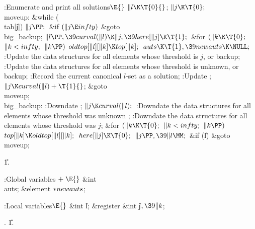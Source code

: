 \Y\B\4:Enumerate and print all solutions\X${}\E{}$\6
$\|l\K\T{0}{}$;\5
${}\|j\K\T{0};{}$\6
\4\\{moveup}:\5
\&{while} (\\{tab}[\|j])\1\5
${}\|j\PP;{}$\2\6
\&{if} ${}(\|j\E\\{infty}){}$\1\5
\&{goto} \\{big\_backup};\2\6
${}\|l\PP,\39\\{curval}(\|l)\K\|j,\39\\{here}[\|j]\K\T{1};{}$\6
\&{for} ${}(\|k\K\T{0};{}$ ${}\|k<\\{infty};{}$ ${}\|k\PP){}$\1\5
${}\\{oldtop}[\|l][\|k]\K\\{top}[\|k];{}$\2\6
${}\\{auts}\K\T{1},\39\\{newauts}\K\NULL;{}$\6
:Update the data structures for all elements whose threshold is $j$, or
backup\X;\6
:Update the data structures for all elements whose threshold is unknown, or
backup\X;\6
:Record the current canonical $l$-set as a solution\X;\6
:Update \X;\6
${}\|j\K\\{curval}(\|l)+\T{1}{}$;\5
\&{goto} \\{moveup};\6
\4\\{big\_backup}:\5
:Downdate \X;\6
${}\|j\K\\{curval}(\|l);{}$\6
:Downdate the data structures for all elements whose threshold was unknown%
\X;\6
:Downdate the data structures for all elements whose threshold was $j$\X;\6
\&{for} ${}(\|k\K\T{0};{}$ ${}\|k<\\{infty};{}$ ${}\|k\PP){}$\1\5
${}\\{top}[\|k]\K\\{oldtop}[\|l][\|k];{}$\2\6
${}\\{here}[\|j]\K\T{0};{}$\6
${}\|j\PP,\39\|l\MM;{}$\6
\&{if} (\|l)\1\5
\&{goto} \\{moveup};\2\par
\U1.\fi

\B{}:Global variables\X${}\mathrel+\E{}$\6
\&{int} \\{auts};\6
\&{element} ${}{*}\\{newauts}{}$;\par
\fi

\B{}:Local variables\X${}\E{}$\6
\&{int} \|l;\6
\&{register} \&{int} \|j${},\39\|k{}$;\par
{}.
\U1.\fi

